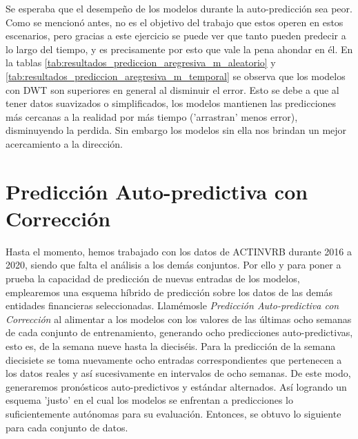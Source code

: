 Se esperaba que el desempeño de los modelos durante la auto-predicción sea peor. Como se mencionó antes, no es el objetivo del trabajo que estos operen en estos escenarios, pero gracias a este ejercicio se puede ver que tanto pueden predecir a lo largo del tiempo, y es precisamente por esto que vale la pena ahondar en él. En la tablas \ref{tab:resultados_prediccion_aregresiva_m_aleatorio} y \ref{tab:resultados_prediccion_aregresiva_m_temporal} se observa que los modelos con DWT son superiores en general al disminuir el error. Esto se debe a que al tener datos suavizados o simplificados, los modelos mantienen las predicciones más cercanas a la realidad por más tiempo ('arrastran' menos error), disminuyendo la perdida. Sin embargo los modelos sin ella nos brindan un mejor acercamiento a la dirección.

\newpage
\section{Predicción Auto-predictiva con Corrección}

Hasta el momento, hemos trabajado con los datos de ACTINVRB durante 2016 a 2020, siendo que falta el análisis a los demás conjuntos. Por ello y para poner a prueba la capacidad de predicción de nuevas entradas de los modelos, emplearemos una esquema híbrido de predicción sobre los datos de las demás entidades financieras seleccionadas. Llamémosle \textit{Predicción Auto-predictiva con Corrección} al alimentar a los modelos con los valores de las últimas ocho semanas de cada conjunto de entrenamiento, generando ocho predicciones auto-predictivas, esto es, de la semana nueve hasta la dieciséis. Para la predicción de la semana diecisiete se toma nuevamente ocho entradas correspondientes que pertenecen a los datos reales y así sucesivamente en intervalos de ocho semanas. De este modo, generaremos pronósticos auto-predictivos y estándar alternados. Así logrando un esquema 'justo' en el cual los modelos se enfrentan a predicciones lo suficientemente autónomas para su evaluación. Entonces, se obtuvo lo siguiente para cada conjunto de datos.

\newpage

